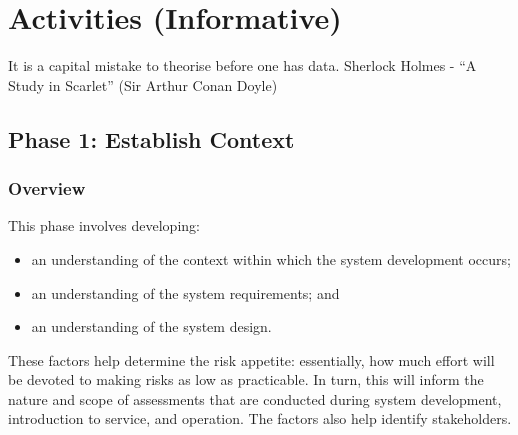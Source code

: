 %
%
\cbstart\chapter{Activities (Informative)}\label{bkm:activitiestailoring}\cbend

\dsiwgSectionQuote
  {It is a capital mistake to theorise before one has data.}
  {Sherlock Holmes - ``A Study in Scarlet'' (Sir Arthur Conan Doyle)}


\section{Phase 1: Establish Context}
\subsection{Overview}
This phase involves developing:
\begin{itemize}
	\item an understanding of the context within which the system development occurs; 
	\item an understanding of the system requirements; and 
	\item an understanding of the system design.
\end{itemize}

These factors help determine the risk appetite: essentially, how much effort will be devoted to making risks as low as practicable. In turn, this will inform the nature and scope of assessments that are conducted during system development, introduction to service, and operation. The factors also help identify \glspl{stakeholder}.

